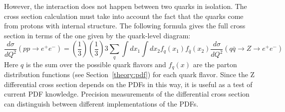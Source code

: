





However, the interaction does not happen 
between two quarks in isolation.  
The cross section calculation must take 
into account the fact that the quarks come from 
protons with internal structure.  
The following formula gives the full cross section 
in terms of the one given by the quark-level diagram: 
\[
\frac{d \sigma}{d Q^2}(pp \rightarrow e^+ e^- )
= \left( \frac{1}{3} \right) \left( \frac{1}{3} \right) 3 
\sum_q \int dx_1 \int dx_2 f_q (x_1) f_{\bar{q}} (x_2)
\frac{d \sigma }{d Q^2}
( q \bar{q} \rightarrow Z \rightarrow e^+ e^- )
\]
Here $q$ is the sum over the possible quark flavors 
and $f_q(x)$ are the parton distribution functions 
(see Section~\ref{theory:pdf}) for each quark flavor.  
Since the Z differential cross section depends 
on the PDFs in this way, 
it is useful as a test of current PDF knowledge.  
Precision measurements of the differential cross section 
can distinguish between different implementations 
of the PDFs.  


